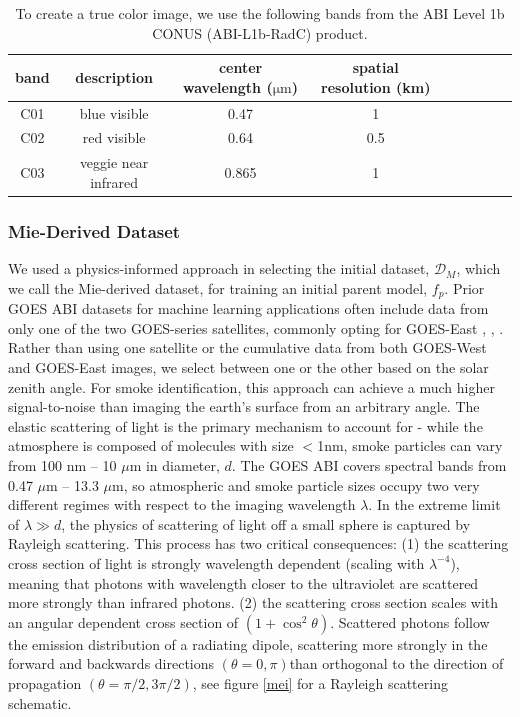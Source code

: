 \documentclass{article}
\begin{document}
\begin{table}
    \caption{To create a true color image, we use the following bands from the ABI Level 1b CONUS (ABI-L1b-RadC) product.}\label{rgb_bands}
    \centering
        \begin{tabular}{ccccrrcrc}
            \toprule
            band & description & center wavelength ($\mathrm{\mu m}$) & spatial resolution (km)\\
            \midrule
            C01 &  blue visible & 0.47 & 1 \\
            C02 & red visible & 0.64 & 0.5 \\
            C03 & veggie near infrared & 0.865 & 1 \\
            \bottomrule
        \end{tabular}
\end{table}


\subsubsection*{Mie-Derived Dataset}

We used a physics-informed approach in selecting the initial dataset, \(\mathcal{D}_M\), which we call the Mie-derived dataset, for training an initial parent model, \(f_p\). Prior GOES ABI datasets for machine learning applications often include data from only one of the two GOES-series satellites, commonly opting for GOES-East \cite{smoke_goes}, \cite{wildfire_detect}, \cite{goes_conv}. Rather than using one satellite or the cumulative data from both GOES-West and GOES-East images, we select between one or the other based on the solar zenith angle. For smoke identification, this approach can achieve a much higher signal-to-noise than imaging the earth’s surface from an arbitrary angle. The elastic scattering of light is the primary mechanism to account for - while the atmosphere is composed of molecules with size \(<\)1nm, smoke particles can vary from 100 nm -- 10 \(\mu\)m in diameter, \(d\). The GOES ABI covers spectral bands from 0.47 \(\mu\)m -- 13.3 \(\mu\)m, so atmospheric and smoke particle sizes occupy two very different regimes with respect to the imaging wavelength \(\lambda\). In the extreme limit of \(\lambda \gg d\), the physics of scattering of light off a small sphere is captured by Rayleigh scattering. This process has two critical consequences: (1) the scattering cross section of light is strongly wavelength dependent (scaling with \(\lambda^{-4}\)), meaning that photons with wavelength closer to the ultraviolet are scattered more strongly than infrared photons. (2) the scattering cross section scales with an angular dependent cross section of \((1 + \cos^2 \theta)\). Scattered photons follow the emission distribution of a radiating dipole, scattering more strongly in the forward and backwards directions \((\theta = 0,\pi)\)than orthogonal to the direction of propagation \((\theta = \pi/2, 3\pi/2)\), see figure \ref{mei} for a Rayleigh scattering schematic.
\end{document}
